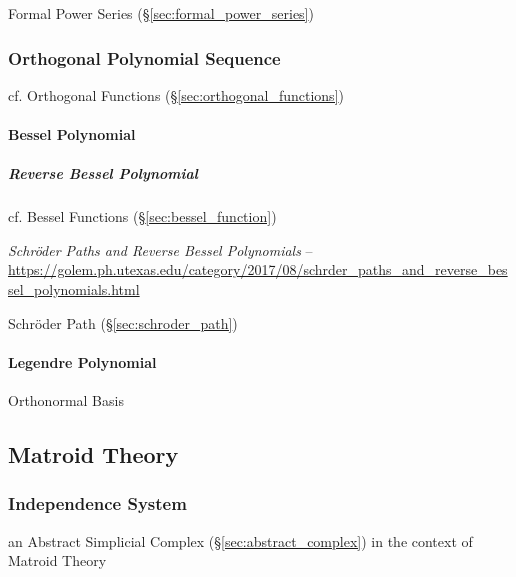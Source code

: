 \fist Formal Power Series (\S\ref{sec:formal_power_series})



\subsubsection{Orthogonal Polynomial Sequence}
\label{sec:orthogonal_polynomial_sequence}

\fist cf. Orthogonal Functions (\S\ref{sec:orthogonal_functions})



\paragraph{Bessel Polynomial}\label{sec:bessel_polynomial}\hfill

\subparagraph{Reverse Bessel Polynomial}\label{sec:reverse_bessel_polynomial}
\hfill

cf. Bessel Functions (\S\ref{sec:bessel_function})

\emph{Schr\"oder Paths and Reverse Bessel Polynomials} --
\url{https://golem.ph.utexas.edu/category/2017/08/schrder_paths_and_reverse_bessel_polynomials.html}

Schr\"oder Path (\S\ref{sec:schroder_path})



\paragraph{Legendre Polynomial}\label{sec:legendre_polynomial}\hfill

Orthonormal Basis



\subsection{Matroid Theory}\label{sec:matroid_theory}

\subsubsection{Independence System}\label{sec:independence_system}

an Abstract Simplicial Complex (\S\ref{sec:abstract_complex}) in the context of
Matroid Theory



